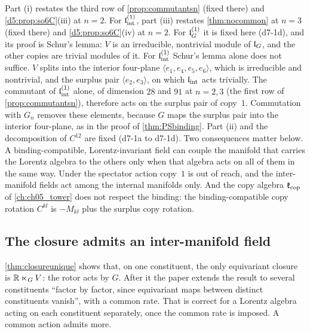 Part (i) restates the third row of \cref{prop:commutantsn} (fixed there) and \cref{d5:prop:so6C}(iii) at $n=2$. For $\mathfrak l_{\rm int}^{(1)}$, part (iii) restates
\cref{thm:nocommon} at $n=3$ (fixed there) and \cref{d5:prop:so6C}(iv) at $n=2$. For $\mathfrak l_G^{(1)}$ it is fixed here (d7-1d), and its proof is Schur's lemma: $V$ is an irreducible,
nontrivial module of $\mathfrak l_G$, and the other copies are trivial modules of it. For $\mathfrak l_{\rm int}^{(1)}$ Schur's lemma alone does not suffice. $V$ splits into the interior four-plane
$\langle e_1,e_4,e_5,e_6\rangle$, which is irreducible and nontrivial, and the surplus pair $\langle e_2,e_3\rangle$, on which $\mathfrak l_{\rm int}$ acts trivially. The commutant of $\mathfrak l_{\rm int}^{(1)}$ alone, of
dimension $28$ and $91$ at $n=2,3$ (the first row of \cref{prop:commutantsn}), therefore acts on the surplus pair of copy~$1$. Commutation with $G_n$ removes
these elements, because $G$ maps the surplus pair into the interior four-plane, as in the proof of \cref{thm:PSbinding}. Part (ii) and the decomposition of
$C^{12}$ are fixed (d7-1a to d7-1d). Two consequences matter below. A binding-compatible, Lorentz-invariant field can couple the manifold that
carries the Lorentz algebra to the others only when that algebra acts on all of them in the same way. Under the spectator action copy~$1$ is out
of reach, and the inter-manifold fields act among the internal manifolds only. And the copy algebra $\mathfrak k_{\rm cop}$ of \cref{ch:ch05_tower} does not respect
the binding: the binding-compatible copy rotation $C^{kl}$ is $-M_{kl}$ plus the surplus copy rotation.

\subsection{The closure admits an inter-manifold field}
\label{d7:sec:rotor}

\cref{thm:closureunique} shows that, on one constituent, the only equivariant closure is $\mathbb{R}\ltimes_GV$: the rotor acts by $G$. After it the
paper extends the result to several constituents ``factor by factor, since equivariant maps between distinct constituents vanish'', with a common
rate. That is correct for a Lorentz algebra acting on each constituent separately, once the common rate is imposed. A common action admits more.

